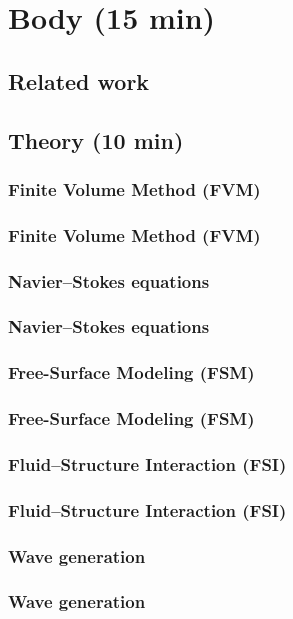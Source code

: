 
\section{Body (15 min)}

\begin{frame}
\frametitle{}
\end{frame}

\subsection{Related work}

\subsection{Theory (10 min)}

\subsubsection{Finite Volume Method (FVM)}
\begin{frame}
\frametitle{Finite Volume Method (FVM)}
\end{frame}

\subsubsection{Navier--Stokes equations}
\begin{frame}
\frametitle{Navier--Stokes equations}
\end{frame}



\subsubsection{Free-Surface Modeling (FSM)}
\begin{frame}
\frametitle{Free-Surface Modeling (FSM)}
\end{frame}

\subsubsection{Fluid--Structure Interaction (FSI)}
\begin{frame}
\frametitle{Fluid--Structure Interaction (FSI)}
\end{frame}

\subsubsection{Wave generation}
\begin{frame}
\frametitle{Wave generation}
\end{frame}

